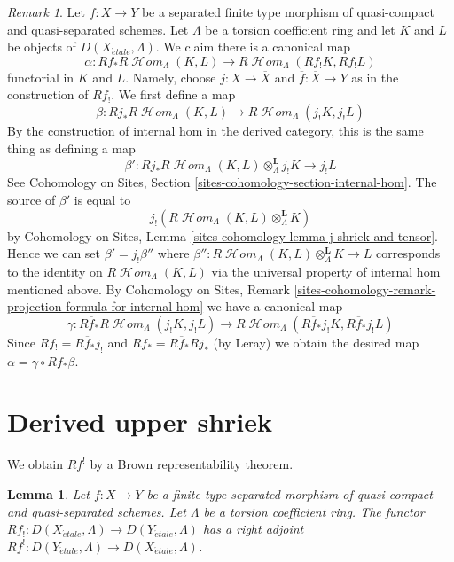 \documentclass{stacks-project}
\theoremstyle{plain}
\newtheorem{lemma}[subsection]{Lemma}
\theoremstyle{definition}
\theoremstyle{remark}
\newtheorem{remark}[subsection]{Remark}
\numberwithin{equation}{subsection}
\def\SheafHom{\mathop{\mathcal{H}\!\mathit{om}}\nolimits}
\def\etale{{\acute{e}tale}}
\begin{document}
\begin{remark}
\label{remark-projection-formula-for-internal-hom}
Let $f : X \to Y$ be a separated finite type morphism of quasi-compact
and quasi-separated schemes. Let $\Lambda$ be a torsion coefficient ring
and let $K$ and $L$ be objects of $D(X_\etale, \Lambda)$. We claim
there is a canonical map
$$
\alpha :
Rf_*R\SheafHom_\Lambda(K, L)
\longrightarrow
R\SheafHom_\Lambda(Rf_!K, Rf_!L)
$$
functorial in $K$ and $L$. Namely, choose $j : X \to \overline{X}$ and
$\overline{f} : \overline{X} \to Y$ as in the construction of $Rf_!$.
We first define a map
$$
\beta :
Rj_*R\SheafHom_\Lambda(K, L)
\longrightarrow
R\SheafHom_\Lambda(j_!K, j_!L)
$$
By the construction of internal hom in the derived category, this is
the same thing as defining a map
$$
\beta' :
Rj_*R\SheafHom_\Lambda(K, L) \otimes_\Lambda^\mathbf{L} j_!K
\longrightarrow
j_!L
$$
See Cohomology on Sites, Section \ref{sites-cohomology-section-internal-hom}.
The source of $\beta'$ is equal to
$$
j_!\left(R\SheafHom_\Lambda(K, L) \otimes_\Lambda^\mathbf{L} K\right)
$$
by Cohomology on Sites, Lemma \ref{sites-cohomology-lemma-j-shriek-and-tensor}.
Hence we can set $\beta' = j_!\beta''$ where
$\beta'' : R\SheafHom_\Lambda(K, L) \otimes_\Lambda^\mathbf{L} K \to L$
corresponds to the identity on $R\SheafHom_\Lambda(K, L)$
via the universal property of internal hom mentioned above. By
Cohomology on Sites, Remark
\ref{sites-cohomology-remark-projection-formula-for-internal-hom}
we have a canonical map
$$
\gamma :
R\overline{f}_*R\SheafHom_\Lambda(j_!K, j_!L)
\longrightarrow
R\SheafHom_\Lambda(R\overline{f}_*j_!K, R\overline{f}_*j_!L)
$$
Since $Rf_! = R\overline{f}_*j_!$ and $Rf_* = R\overline{f}_* Rj_*$
(by Leray) we obtain the desired map
$\alpha = \gamma \circ R\overline{f}_*\beta$.
\end{remark}









\section{Derived upper shriek}
\label{section-derived-upper-shriek}

\noindent
We obtain $Rf^!$ by a Brown representability theorem.

\begin{lemma}
\label{lemma-upper-shriek-derived}
Let $f : X \to Y$ be a finite type separated morphism of quasi-compact
and quasi-separated schemes. Let $\Lambda$ be a torsion coefficient ring.
The functor
$Rf_! : D(X_\etale, \Lambda) \to D(Y_\etale, \Lambda)$
has a right adjoint
$Rf^! : D(Y_\etale, \Lambda) \to D(X_\etale, \Lambda)$.
\end{lemma}
\end{document}
